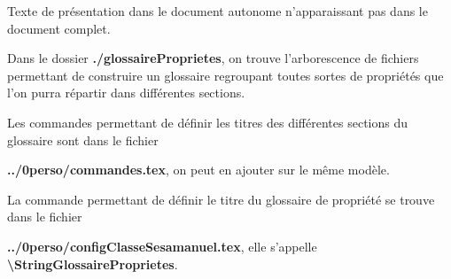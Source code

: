 \documentclass[nocrop]{\persopath/sesamanuel}
\begin{document}
Texte de présentation dans le document autonome n'apparaissant pas dans le document complet.

\medskip

Dans le dossier \textbf{./glossaireProprietes}, on trouve l'arborescence de fichiers permettant de construire un glossaire
regroupant toutes sortes de propriétés que l'on purra répartir dans différentes sections.

\medskip

Les commandes permettant de définir les titres des différentes sections du glossaire sont dans le fichier \par 
\textbf{../0perso/commandes.tex}, on peut en ajouter sur le même modèle.

\medskip

La commande permettant de définir le titre du glossaire de propriété se trouve dans le fichier \par
\textbf{../0perso/configClasseSesamanuel.tex}, elle s'appelle \textbf{\textbackslash StringGlossaireProprietes}.


\end{document}
